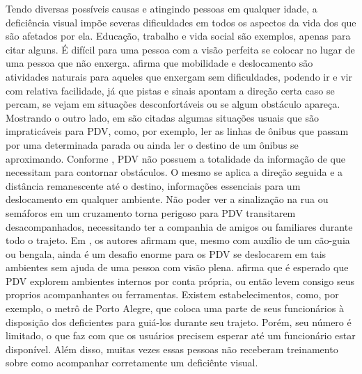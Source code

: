 \documentclass[english,brazilian]{UNISINOSmonografia}
\begin{document}
Tendo diversas possíveis causas e atingindo pessoas em qualquer idade, a deficiência visual impõe severas dificuldades em todos os aspectos da vida dos que são afetados por ela. Educação, trabalho e vida social são exemplos, apenas para citar alguns. É difícil para uma pessoa com a visão perfeita se colocar no lugar de uma pessoa que não enxerga.  afirma que mobilidade e deslocamento são atividades naturais para aqueles que enxergam sem dificuldades, podendo ir e vir com relativa facilidade, já que pistas e sinais apontam a direção certa caso se percam, se vejam em situações desconfortáveis ou se algum obstáculo apareça. Mostrando o outro lado, em  são citadas algumas situações usuais que são impraticáveis para PDV, como, por exemplo, ler as linhas de ônibus que passam por uma determinada parada ou ainda ler o destino de um ônibus se aproximando. Conforme , PDV não possuem a totalidade da informação de que necessitam para contornar obstáculos. O mesmo se aplica a direção seguida e a distância remanescente até o destino, informações essenciais para um deslocamento em qualquer ambiente. Não poder ver a sinalização na rua ou semáforos em um cruzamento torna perigoso para PDV transitarem desacompanhados, necessitando ter a companhia de amigos ou familiares durante todo o trajeto. 
Em , os autores afirmam que, mesmo com auxílio de um cão-guia ou bengala, ainda é um desafio enorme para os PDV se deslocarem em tais ambientes sem ajuda de uma pessoa com visão plena. 
 afirma que é esperado que PDV explorem ambientes internos por conta própria, ou então levem consigo seus proprios acompanhantes ou ferramentas. Existem estabelecimentos, como, por exemplo, o metrô de Porto Alegre, que coloca uma parte de seus funcionários à disposição dos deficientes para guiá-los durante seu trajeto. Porém, seu número é limitado, o que faz com que os usuários precisem esperar até um funcionário estar disponível. Além disso, muitas vezes essas pessoas não receberam treinamento sobre como acompanhar corretamente um deficiênte visual.
\end{document}
